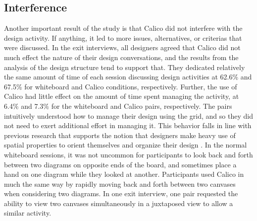 \subsection {Interference}
\label{discussion:3}

Another important result of the study is that Calico did not interfere with the design activity. If anything, it led to more issues, alternatives, or criterias that were discussed. In the exit interviews, all designers agreed that Calico did not much effect the nature of their design conversations, and the results from the analysis of the design structure tend to support that. They dedicated relatively the same amount of time of each session discussing design activities at 62.6\% and 67.5\% for whiteboard and Calico conditions, respectively. Further, the use of Calico had little effect on the amount of time spent managing the activity, at 6.4\% and 7.3\% for the whiteboard and Calico pairs, respectively. The pairs intuitively understood how to manage their design using the grid, and so they did not need to exert additional effort in managing it. This behavior falls in line with previous research that supports the notion that designers make heavy use of spatial properties to orient themselves and organize their design \citep{Nickerson,Brooksa}. In the normal whiteboard sessions, it was not uncommon for participants to look back and forth between two diagrams on opposite ends of the board, and sometimes place a hand on one diagram while they looked at another. Participants used Calico in much the same way by rapidly moving back and forth between two canvases when considering two diagrams. In one exit interview, one pair requested the ability to view two canvases simultaneously in a juxtaposed view to allow a similar activity. 

